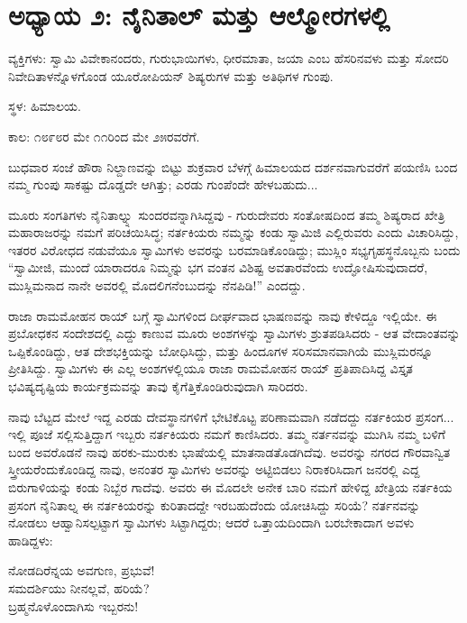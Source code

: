 
\chapter{ಅಧ್ಯಾಯ ೨: ನೈನಿತಾಲ್ ಮತ್ತು ಆಲ್ಮೋರಗಳಲ್ಲಿ}

ವ್ಯಕ್ತಿಗಳು: ಸ್ವಾಮಿ ವಿವೇಕಾನಂದರು, ಗುರುಭಾಯಿಗಳು, ಧೀರಮಾತಾ, ಜಯಾ ಎಂಬ ಹೆಸರಿನವಳು ಮತ್ತು ಸೋದರಿ ನಿವೇದಿತಾಳನ್ನೊಳಗೊಂಡ ಯೂರೋಪಿಯನ್ ಶಿಷ್ಯರುಗಳ ಮತ್ತು ಅತಿಥಿಗಳ ಗುಂಪು.

ಸ್ಥಳ: ಹಿಮಾಲಯ.

ಕಾಲ: ೧೮೯೮ರ ಮೇ ೧೧ರಿಂದ ಮೇ ೨೫ರವರೆಗೆ.

ಬುಧವಾರ ಸಂಜೆ ಹೌರಾ ನಿಲ್ದಾಣವನ್ನು ಬಿಟ್ಟು ಶುಕ್ರವಾರ ಬೆಳಗ್ಗೆ ಹಿಮಾಲಯದ ದರ್ಶನವಾಗುವರೆಗೆ ಪಯಣಿಸಿ ಬಂದ ನಮ್ಮ ಗುಂಪು ಸಾಕಷ್ಟು ದೊಡ್ಡದೇ ಆಗಿತ್ತು; ಎರಡು ಗುಂಪೆಂದೇ ಹೇಳಬಹುದು...

ಮೂರು ಸಂಗತಿಗಳು ನೈನಿತಾಲ್ನ್ನು ಸುಂದರವನ್ನಾಗಿಸಿದ್ದವು - ಗುರುದೇವರು ಸಂತೋಷದಿಂದ ತಮ್ಮ ಶಿಷ್ಯರಾದ ಖೇತ್ರಿ ಮಹಾರಾಜರನ್ನು ನಮಗೆ ಪರಿಚಯಿಸಿದ್ಧ; ನರ್ತಕಿಯರು ನಮ್ಮನ್ನು ಕಂಡು ಸ್ವಾಮಿಜಿ ಎಲ್ಲಿರುವರು ಎಂದು ವಿಚಾರಿಸಿದ್ದು, ಇತರರ ವಿರೋಧದ ನಡುವೆಯೂ ಸ್ವಾಮಿಗಳು ಅವರನ್ನು ಬರಮಾಡಿಕೊಂಡಿದ್ದು; ಮುಸ್ಲಿಂ ಸಭ್ಯಗೃಹಸ್ಥನೊಬ್ಬನು ಬಂದು “ಸ್ವಾಮೀಜಿ, ಮುಂದೆ ಯಾರಾದರೂ ನಿಮ್ಮನ್ನು ಭಗ ವಂತನ ವಿಶಿಷ್ಟ ಅವತಾರವೆಂದು ಉದ್ಘೋಷಿಸುವುದಾದರೆ, ಮುಸ್ಲಿಮನಾದ ನಾನೇ ಅವರಲ್ಲಿ ಮೊದಲಿಗನೆಂಬುದನ್ನು ನೆನಪಿಡಿ!” ಎಂದದ್ದು.

ರಾಜಾ ರಾಮಮೋಹನ ರಾಯ್​ ಬಗ್ಗೆ ಸ್ವಾಮಿಗಳಿಂದ ದೀರ್ಘವಾದ ಭಾಷಣವನ್ನು ನಾವು ಕೇಳಿದ್ದೂ ಇಲ್ಲಿಯೇ. ಈ ಪ್ರಬೋಧಕನ ಸಂದೇಶದಲ್ಲಿ ಎದ್ದು ಕಾಣುವ ಮೂರು ಅಂಶಗಳನ್ನು ಸ್ವಾಮಿಗಳು ಶ್ರುತಪಡಿಸಿದರು - ಆತ ವೇದಾಂತವನ್ನು ಒಪ್ಪಿಕೊಂಡಿದ್ದು, ಆತ ದೇಶಭಕ್ತಿಯನ್ನು ಬೋಧಿಸಿದ್ದು, ಮತ್ತು ಹಿಂದೂಗಳ ಸರಿಸಮಾನವಾಗಿಯೆ ಮುಸ್ಲಿಮರನ್ನೂ ಪ್ರೀತಿಸಿದ್ದು. ಸ್ವಾಮಿಗಳು ಈ ಎಲ್ಲ ಅಂಶಗಳಲ್ಲಿಯೂ ರಾಜಾ ರಾಮಮೋಹನ ರಾಯ್​ ಪ್ರತಿಪಾದಿಸಿದ್ದ ವಿಸ್ತೃತ ಭವಿಷ್ಯದೃಷ್ಟಿಯ ಕಾರ್ಯಕ್ರಮವನ್ನು ತಾವು ಕೈಗೆತ್ತಿಕೊಂಡಿರುವುದಾಗಿ ಸಾರಿದರು.

ನಾವು ಬೆಟ್ಟದ ಮೇಲೆ ಇದ್ದ ಎರಡು ದೇವಸ್ಥಾನಗಳಿಗೆ ಭೇಟಿಕೊಟ್ಟ ಪರಿಣಾಮವಾಗಿ ನಡೆದದ್ದು ನರ್ತಕಿಯರ ಪ್ರಸಂಗ... ಇಲ್ಲಿ ಪೂಜೆ ಸಲ್ಲಿಸುತ್ತಿದ್ದಾಗ ಇಬ್ಬರು ನರ್ತಕಿಯರು ನಮಗೆ ಕಾಣಿಸಿದರು. ತಮ್ಮ ನರ್ತನವನ್ನು ಮುಗಿಸಿ ನಮ್ಮ ಬಳಿಗೆ ಬಂದ ಅವರೊಡನೆ ನಾವು ಹರಕು-ಮುರುಕು ಭಾಷೆಯಲ್ಲಿ ಮಾತನಾಡತೊಡಗಿದೆವು. ಅವರನ್ನು ನಗರದ ಗೌರವಾನ್ವಿತ ಸ್ತ್ರೀಯರೆಂದುಕೊಂಡಿದ್ದ ನಾವು, ಅನಂತರ ಸ್ವಾಮಿಗಳು ಅವರನ್ನು ಅಟ್ಟಿಬಿಡಲು ನಿರಾಕರಿಸಿದಾಗ ಜನರಲ್ಲಿ ಎದ್ದ ಬಿರುಗಾಳಿಯನ್ನು ಕಂಡು ನಿಬ್ಬೆರ ಗಾದೆವು. ಅವರು ಈ ಮೊದಲೇ ಅನೇಕ ಬಾರಿ ನಮಗೆ ಹೇಳಿದ್ದ ಖೇತ್ರಿಯ ನರ್ತಕಿಯ ಪ್ರಸಂಗ ನೈನಿತಾಲ್ನ ಈ ನರ್ತಕಿಯರನ್ನು ಕುರಿತಾದದ್ದೇ ಇರಬಹುದೆಂದು ಯೋಚಿಸಿದ್ದು ಸರಿಯೆ? ನರ್ತನವನ್ನು ನೋಡಲು ಆಹ್ವಾನಿಸಲ್ಪಟ್ಟಾಗ ಸ್ವಾಮಿಗಳು ಸಿಟ್ಟಾಗಿದ್ದರು; ಆದರೆ ಒತ್ತಾಯದಿಂದಾಗಿ ಬರಬೇಕಾದಾಗ ಅವಳು ಹಾಡಿದ್ದಳು:

\begin{myquote}
ನೋಡದಿರೆನ್ನಯ ಅವಗುಣ, ಪ್ರಭುವೆ!\\ಸಮದರ್ಶಿಯು ನೀನಲ್ಲವೆ, ಹರಿಯೆ?\\ಬ್ರಹ್ಮನೊಳೊಂದಾಗಿಸು ಇಬ್ಬರನು!
\end{myquote}

